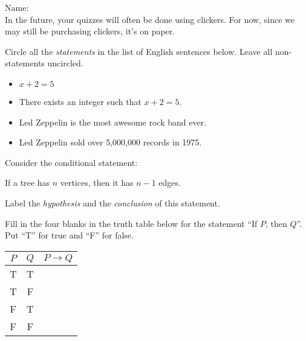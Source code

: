 \documentclass[addpoints]{exam}
\begin{document}
		
\vspace*{0pt}

\noindent
Name: \underline{\hspace{2in}} \\


\noindent
In the future, your quizzes will often be done using clickers. For now, since we may still be purchasing clickers, it's on paper. 

\begin{questions}
	
	\question[1] Circle all the \emph{statements} in the list of English sentences below. Leave all non-statements uncircled. 
	\begin{itemize}
		\item $x + 2 = 5$
		\item There exists an integer such that $x + 2 = 5$. 
		\item Led Zeppelin is the most awesome rock band ever. 
		\item Led Zeppelin sold over 5,000,000 records in 1975. 
	\end{itemize}
	
	
	
	\question[1] Consider the conditional statement: 
	\begin{center}
		If a tree has $n$ vertices, then it has $n-1$ edges. 
	\end{center}
	\vspace{0.5in}
	Label the \emph{hypothesis} and the \emph{conclusion} of this statement. 
	
	\question[1] Fill in the four blanks in the truth table below for the statement ``If $P$, then $Q$''. Put ``T'' for true and ``F'' for false. 
	\begin{center}
		\begin{tabular}{cc|c}
		$P$ & $Q$ & $P \rightarrow Q$ \\ \hline
		T & T & \fbox{\parbox{0.2in}{\hspace{0.2in}}} \\
		T & F &\fbox{\parbox{0.2in}{\hspace{0.2in}}}  \\
		F & T & \fbox{\parbox{0.2in}{\hspace{0.2in}}}  \\
		F & F & \fbox{\parbox{0.2in}{\hspace{0.2in}}}  \\
		\end{tabular}
	\end{center}
	
	
\end{questions}
\end{document}
